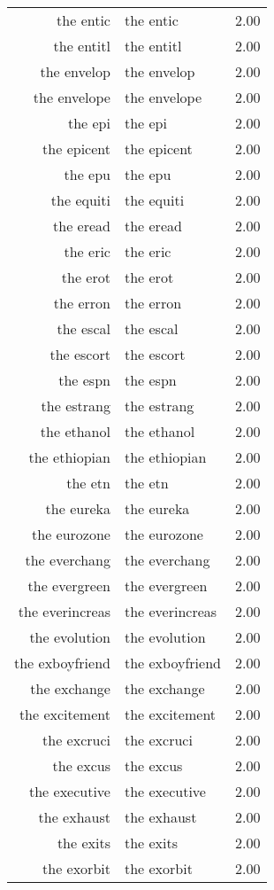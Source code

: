 \begin{table}[ht]
\begin{tabular}{rlr}
  the entic & the entic & 2.00 \\ 
  the entitl & the entitl & 2.00 \\ 
  the envelop & the envelop & 2.00 \\ 
  the envelope & the envelope & 2.00 \\ 
  the epi & the epi & 2.00 \\ 
  the epicent & the epicent & 2.00 \\ 
  the epu & the epu & 2.00 \\ 
  the equiti & the equiti & 2.00 \\ 
  the eread & the eread & 2.00 \\ 
  the eric & the eric & 2.00 \\ 
  the erot & the erot & 2.00 \\ 
  the erron & the erron & 2.00 \\ 
  the escal & the escal & 2.00 \\ 
  the escort & the escort & 2.00 \\ 
  the espn & the espn & 2.00 \\ 
  the estrang & the estrang & 2.00 \\ 
  the ethanol & the ethanol & 2.00 \\ 
  the ethiopian & the ethiopian & 2.00 \\ 
  the etn & the etn & 2.00 \\ 
  the eureka & the eureka & 2.00 \\ 
  the eurozone & the eurozone & 2.00 \\ 
  the everchang & the everchang & 2.00 \\ 
  the evergreen & the evergreen & 2.00 \\ 
  the everincreas & the everincreas & 2.00 \\ 
  the evolution & the evolution & 2.00 \\ 
  the exboyfriend & the exboyfriend & 2.00 \\ 
  the exchange & the exchange & 2.00 \\ 
  the excitement & the excitement & 2.00 \\ 
  the excruci & the excruci & 2.00 \\ 
  the excus & the excus & 2.00 \\ 
  the executive & the executive & 2.00 \\ 
  the exhaust & the exhaust & 2.00 \\ 
  the exits & the exits & 2.00 \\ 
  the exorbit & the exorbit & 2.00 \\ 

\end{tabular}
\end{table}
